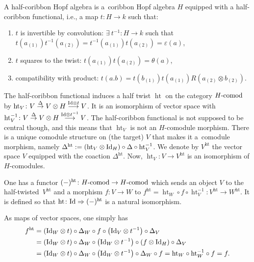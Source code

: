 \documentclass[pdftex]{sigma}%
\numberwithin{equation}{section}
\newcommand{\halft}{{\operatorname{ht}}}
\begin{document}
\begin{Definition}
A half-coribbon Hopf algebra is a~coribbon Hopf algebra $H$ equipped with a half-coribbon functional, i.e., a map $t \colon H \to k$ such that:
\begin{enumerate}\itemsep=0pt
\item[$(1)$] $t$ is invertible by convolution: $\exists\ t^{-1} \colon H \to k$ such that $t(a_{(1)})t^{-1}(a_{(2)}) = t^{-1}(a_{(1)})t(a_{(2)}) = \varepsilon(a)$,

\item[$(2)$] $t$ squares to the twist: $t(a_{(1)})t(a_{(2)}) = \theta(a)$,

\item[$(3)$] compatibility with product: $t(a.b) = t(b_{(1)}) t(a_{(1)})R(a_{(2)}\otimes b_{(2)})$.
\end{enumerate}
\end{Definition}
\begin{Definition}
The half-coribbon functional induces a half twist $\halft$ on the category $H\text{-}{\rm comod}$ by $\halft_V\colon V \overset{\Delta}{\to} V \otimes H \overset{{\rm Id} \otimes t}{\longrightarrow} V$. It is an isomorphism of vector space with $\halft_V^{-1} \colon V \overset{\Delta}{\to} V \otimes H \overset{{\rm Id} \otimes t^{-1}}{\longrightarrow} V$. The half-coribbon functional is not supposed to be central though, and this means that $\halft_V$ is not an $H$-comodule morphism. There is a unique comodule structure on (the target) $V$ that makes it a~comodule morphism, namely $\Delta^\halft := (\halft_V \otimes {\rm Id}_H) \circ \Delta \circ \halft_V^{-1}$. We denote by $V^\halft$ the vector space $V$ equipped with the coaction $\Delta^\halft$. Now, $\halft_V \colon V \to V^\halft$ is an isomorphism of $H$-comodules.

One has a functor $(-)^\halft\colon H\text{-}{\rm comod} \to H\text{-}{\rm comod}$ which sends an object $V$ to the half-twisted~$V^\halft$ and a morphism $f\colon V\to W$ to $f^\halft = \halft_W \circ f \circ \halft_V^{-1}\colon V^\halft \to W^\halft$. It is defined so that $\halft\colon {\rm Id} \Rightarrow (-)^\halft$ is a natural isomorphism.
\end{Definition}
As maps of vector spaces, one simply has
\begin{align*}
f^\halft &= ({\rm Id}_W \otimes t) \circ \Delta_W \circ f \circ \big({\rm Id}_V \otimes t^{-1}\big) \circ \Delta_V \\
&= ({\rm Id}_W \otimes t) \circ \Delta_W \circ\big({\rm Id}_W \otimes t^{-1}\big) \circ (f \otimes {\rm Id}_H) \circ \Delta_V
\\
& = ({\rm Id}_W \otimes t) \circ \Delta_W \circ\big({\rm Id}_W \otimes t^{-1}\big) \circ \Delta_W \circ f= \halft_W \circ \halft_W^{-1} \circ f = f.
\end{align*}
\end{document}
